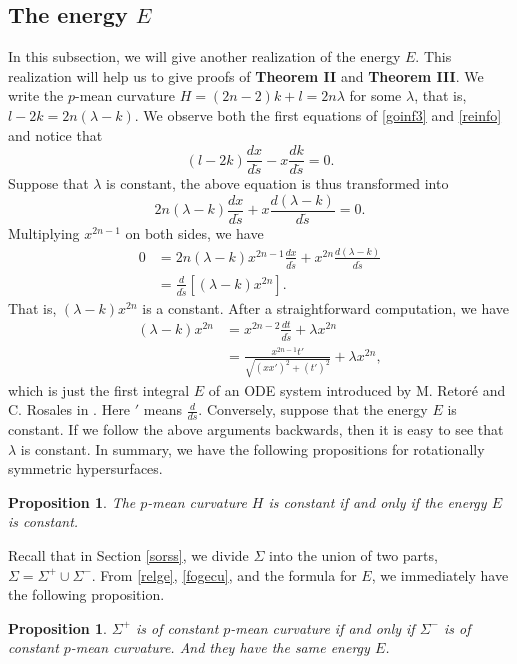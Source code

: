 \documentclass[12pt]{amsart}
\newtheorem{prop}[thm]{\sc Proposition}
\theoremstyle{definition}\newtheorem{exa}[thm]{\sc Example}
\theoremstyle{definition}\newtheorem{de}[thm]{\sc Definition}
\theoremstyle{definition}\newtheorem{rem}[thm]{\sc Remark}
\theoremstyle{definition}\newtheorem{prob}[thm]{\it Problem}
\theoremstyle{definition}\newtheorem{fact}[thm]{\sc Fact}
\theoremstyle{definition}\newtheorem{claim}[thm]{\sc Claim}
\numberwithin{equation}{section}
\begin{document}
\subsection{The energy $E$}\label{energy}
In this subsection, we will give another realization of the energy $E$. This realization will help us to give proofs of {\bf Theorem II} and {\bf Theorem III}.
We write the $p$-mean curvature $H=(2n-2)k+l=2n\lambda$ for some $\lambda$, that is, $l-2k=2n(\lambda-k)$.
We observe both the first equations of \eqref{goinf3} and \eqref{reinfo} and notice that
\[(l-2k)\frac{dx}{d\tilde{s}}-x\frac{dk}{d\tilde{s}}=0.\]
Suppose that $\lambda$ is constant, the above equation is thus transformed into
\[2n(\lambda-k)\frac{dx}{d\tilde{s}}+x\frac{d(\lambda-k)}{d\tilde{s}}=0.\]
Multiplying $x^{2n-1}$ on both sides, we have
\[\begin{split}
0&=2n(\lambda-k)x^{2n-1}\frac{dx}{d\tilde{s}}+x^{2n}\frac{d(\lambda-k)}{d\tilde{s}}\\
&=\frac{d}{d\tilde{s}}\left[(\lambda-k)x^{2n}\right].
\end{split}\]
That is, $(\lambda-k)x^{2n}$ is a constant. After a straightforward computation, we have
\[\begin{split} 
(\lambda-k)x^{2n}&=x^{2n-2}\frac{dt}{d\tilde{s}}+\lambda x^{2n}\\
&=\frac{x^{2n-1}t'}{\sqrt{(xx')^{2}+(t')^2}}+\lambda x^{2n},
\end{split}\]
which is just the first integral $E$  of an ODE system introduced by M. Retor\'e and C. Rosales in \cite{RR}. Here $
'$ means $\frac{d}{ds}$.
Conversely, suppose that the energy $E$ is constant. If we follow the above arguments backwards, then it is easy to see that $\lambda$ is constant.
In summary, we have the following propositions for rotationally symmetric hypersurfaces.
\begin{prop}\label{chaofcon}
The $p$-mean curvature $H$ is constant if and only if the energy $E$ is constant.
\end{prop}
Recall that in Section \ref{sorss}, we divide $\Sigma$ into the union of two parts, $\Sigma=\Sigma^{+}\cup\Sigma^{-}$. From \eqref{relge}, \eqref{fogecu}, and the formula for $E$, we immediately have the following proposition.
\begin{prop}\label{chaofcon1}
$\Sigma^{+}$ is of constant $p$-mean curvature if and only if $\Sigma^{-}$ is of constant $p$-mean curvature. And they have the same energy $E$.
\end{prop}
\end{document}
